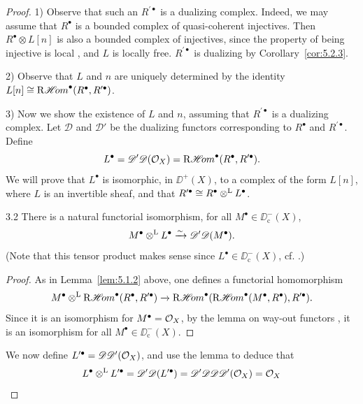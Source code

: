 \begin{proof}
1) Observe that such an $R^{\prime\bullet}$ is a dualizing complex. Indeed, we may assume that $R^\bullet$ is a bounded complex of quasi-coherent injectives. Then $R^\bullet\otimes L[n]$ is also a bounded complex of injectives, since the property of being injective is local , and $L$ is locally free. $R^{\prime\bullet}$ is dualizing by Corollary~\ref{cor:5.2.3}.

2) Observe that $L$ and $n$ are uniquely determined by the identity $L[n]\cong \mathop{\mathrm{R}\mathscr{H}\!om}\nolimits^\bullet(R^\bullet,R^{\prime\bullet})$.

3) Now we show the existence of $L$ and $n$, assuming that $R^{\prime\bullet}$ is a dualizing complex. Let $\mathscr{D}$ and $\mathscr{D}'$ be the dualizing functors corresponding to $R^\bullet$ and $R^{\prime\bullet}$. Define
\[
L^\bullet = \mathscr{D}'\mathscr{D}(\mathcal{O}_X) = \mathop{\mathrm{R}\mathscr{H}\!om}\nolimits^\bullet(R^\bullet,R^{\prime\bullet}).
\]
We will prove that $L^\bullet$ is isomorphic, in $\DD^+(X)$, to a complex of the form $L[n]$, where $L$ is an invertible sheaf, and that $R^{\prime\bullet}\cong R^{\bullet}\mathbin{\otimes^{\mathrm{L}}} L^{\bullet}$.

\begin{booklemma}{3.2}\label{lem:5.3.2}
There is a natural functorial isomorphism, for all $M^{\bullet}\in\DD_{\mathrm{c}}^{-}(X)$,
\[
M^{\bullet}\mathbin{\otimes^{\mathrm{L}}} L^{\bullet}\xrightarrow{\sim} \mathscr{D}'\mathscr{D}(M^{\bullet}).
\]
(Note that this tensor product makes sense since $L^\bullet\in\DD^-_{\mathrm{c}}(X)$, cf. .)
\end{booklemma}

\begin{proof}
As in Lemma~\ref{lem:5.1.2} above, one defines a functorial homomorphism
\[
M^{\bullet}\mathbin{\otimes^{\mathrm{L}}} \mathop{\mathrm{R}\mathscr{H}\!om}\nolimits^{\bullet}(R^{\bullet},R^{\prime\bullet})\xrightarrow{} \mathop{\mathrm{R}\mathscr{H}\!om}\nolimits^{\bullet}(\mathop{\mathrm{R}\mathscr{H}\!om}\nolimits^{\bullet}(M^{\bullet},R^{\bullet}),R^{\prime\bullet}).
\]
Since it is an isomorphism for $M^{\bullet}=\mathcal{O}_X$, by the lemma on way-out functors , it is an isomorphism for all $M^{\bullet}\in\DD_{\mathrm{c}}^{-}(X)$.
\end{proof}

We now define $L^{\prime\bullet} = \mathscr{D}\mathscr{D}'(\mathcal{O}_X)$, and use the lemma to deduce that
\[
L^\bullet \mathbin{\otimes^{\mathrm{L}}} L^{\prime\bullet} = \mathscr{D}'\mathscr{D}(L^{\prime\bullet}) = \mathscr{D}'\mathscr{D}\mathscr{D}\mathscr{D}'(\mathcal{O}_X) = \mathcal{O}_X
\]



\end{proof}
